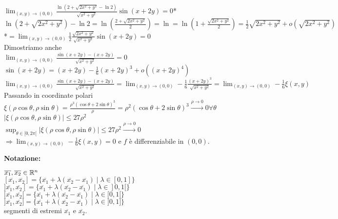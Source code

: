 \begin{exbar}
\begin{example}
\begin{enumerate}
		$\lim_{(x,y)\rightarrow(0,0)}\frac{\ln(2+\sqrt{2x^2+y^2}-\ln2)}{\sqrt{x^2+y^2}}\sin(x+2y)=0$*\\
		$\ln(2+\sqrt{2x^2+y^2})-\ln2=\ln\left( \frac{2+\sqrt{2x^2+y^2}}{2}\right)=\ln=\ln\left(1+\frac{\sqrt{2x^2+y^2}}{2}\right)=\frac{1}{2}\sqrt{2x^2+y^2}+o(\sqrt{2x^2+y^2})$\\
		*$=\lim_{(x,y)\rightarrow(0,0)}\frac{1}{2}\frac{\sqrt{2x^2+y^2}}{\sqrt{x^2+y^2}}\sin(x+2y)=0$\\
		Dimostriamo anche\\
		$\lim_{(x,y)\rightarrow(0,0)}\frac{\sin(x+2y)-(x+2y)}{\sqrt{x^2+y^2}}=0$\\
		$\sin(x+2y)=(x+2y)-\frac{1}{6}(x+2y)^3+o((x+2y)^4)$\\
		$\lim_{(x,y)\rightarrow(0,0)}\frac{\sin(x+2y)-(x+2y)}{\sqrt{x^2+y^2}}=\lim_{(x,y)\rightarrow(0,0)}-\frac{1}{6}\frac{(x+2y)^3}{\sqrt{x^2+y^2}}=\lim_{(x,y)\rightarrow(0,0)}-\frac{1}{6}\xi(x,y)$\\
		Passando in coordinate polari\\
		$\xi(\rho\cos\theta,\rho\sin\theta)=\frac{\rho^3(\cos\theta+2\sin\theta)^3}{\rho}=\rho^2(\cos\theta+2\sin\theta)^3\xrightarrow{\rho\rightarrow 0}0 \forall \theta$\\
		$|\xi(\rho\cos\theta,\rho\sin\theta)|\leq 27\rho^2$\\
		$\sup_{\theta \in [0,2\pi[}|\xi(\rho\cos\theta,\rho\sin\theta)|\leq 27\rho^2\xrightarrow{\rho \rightarrow 0}0$\\
		$\Rightarrow\lim_{(x,y)\rightarrow(0,0)}-\frac{1}{6}\xi(x,y)=0$  e $f$ è differenziabile in $(0,0)$.
	\end{enumerate}
\end{example}
\end{exbar}


\begin{attbar}
	\textbf{Notazione:}
	
	$\overline{x_1},\overline{x_2}\in\mathbb{R}^n$\\
	$[\overline{x_1},\overline{x_2}]=\{\overline{x_1}+\lambda(\overline{x_2}-\overline{x_1})\mid\lambda\in[0,1]\}$\\
	$]\overline{x_1},\overline{x_2}[=\{\overline{x_1}+\lambda(\overline{x_2}-\overline{x_1})\mid\lambda\in]0,1[\}$\\
	$[\overline{x_1},\overline{x_2}[=\{\overline{x_1}+\lambda(\overline{x_2}-\overline{x_1})\mid\lambda\in[0,1[\}$\\
	$]\overline{x_1},\overline{x_2}]=\{\overline{x_1}+\lambda(\overline{x_2}-\overline{x_1})\mid\lambda\in]0,1]\}$\\
	segmenti di estremi $\overline{x_1}$ e $\overline{x_2}$.
\end{attbar}


